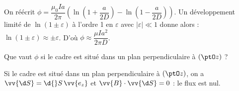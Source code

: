 
\begin{corrige}
On réécrit $\phi=\dfrac{\mu_{0}Ia}{2\pi}\left( \ln\left(1+\dfrac{a}{2D}\right)-\ln\left(1-\dfrac{a}{2D}\right)\right)$.
Un développement limité de $\ln\left(1\pm\varepsilon\right)$
à l'ordre 1 en $\varepsilon$ avec $\left|\varepsilon\right|\ll1$
donne alors : $\ln\left(1\pm\varepsilon\right)\approx\pm\varepsilon$. D'où $\phi\approx\dfrac{\mu Ia^{2}}{2\pi D}$.
\end{corrige}




\begin{enonce}
Que vaut $\phi$ si le cadre est situé dans un plan perpendiculaire à $(\ptO z)$ ?
\end{enonce}


\begin{corrige}
Si le cadre est situé dans un plan perpendiculaire à $(\ptO z)$, on a
$\vv{\d S}=\d{}S\,\vv{e_z}$ et $\vv{B}\cdot\vv{\d S}=0$ : le flux est nul.
\end{corrige}


\finEntrainement











